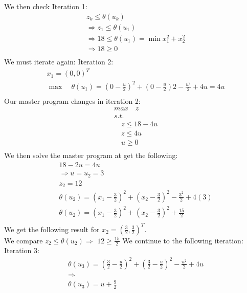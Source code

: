 \documentclass[12pt]{article}
\begin{document}
    We then check Iteration 1:\\
        \begin{align*}
            &z_k \leq \theta(u_k)\\
            &\Rightarrow z_1 \leq \theta(u_1)\\
            &\Rightarrow 18 \leq \theta(u_1) = \min x_1^2 + x_2^2\\
            &\Rightarrow 18 \geq 0\\
        \end{align*}
    We must iterate again: Iteration 2:\\
        \begin{align*}
            &x_1 = (0,0)^T\\
            & \max \quad \theta(u_1) = (0 - \frac{u}{2})^2 + (0 - \frac{u}{2})2 - \frac{u^2}{2} + 4u = 4u\\
        \end{align*}
    Our master program changes in iteration 2:\\ 
        \begin{align*}
            & max \quad z\\
            &s.t.\\
            &\quad z\leq 18 - 4u\\
            &\quad z \leq 4u\\
            &\quad u \geq 0\\
        \end{align*}
    We then solve the master program at get the following:\\
        \begin{align*}
            &18 -2u = 4u\\
            &\Rightarrow u = u_2 = 3\\
            &z_2 = 12\\
            &\theta(u_2) = (x_1 - \frac{3}{2})^2 + (x_2 - \frac{3}{2})^2 - \frac{3^2}{2} + 4(3)\\
            &\theta(u_2) = (x_1 - \frac{3}{2})^2 + (x_2 - \frac{3}{2})^2 + \frac{15}{2}\\
        \end{align*}
    We get the following result for $x_2 = (\frac{3}{2}, \frac{3}{2})^T$.\\
    We compare $z_2 \leq \theta(u_2) \Rightarrow$  $12 \geq \frac{15}{2}$
    We continue to the following iteration:\\
    Iteration 3:\\
        \begin{align*}
            &\theta(u_3) = (\frac{3}{2} - \frac{u}{2})^2 + (\frac{3}{2} - \frac{u}{2})^2 - \frac{u^2}{2} + 4u\\
            &\Rightarrow\\
            &\theta(u_3) = u + \frac{9}{2}\\
        \end{align*}
\end{document}
